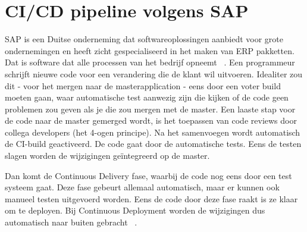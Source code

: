 \section{CI/CD pipeline volgens SAP}
\label{sec:ci-cd-pipeling-volgens-sap}
SAP is een Duitse onderneming dat softwareoplossingen aanbiedt voor grote ondernemingen en heeft zicht gespecialiseerd in het maken van ERP pakketten. Dat is software dat alle processen van het bedrijf opneemt ~\autocite{SAPERP2019}.
Een programmeur schrijft nieuwe code voor een verandering die de klant wil uitvoeren. Idealiter zou dit - voor het mergen naar de masterapplication - eens door een voter build moeten gaan, waar automatische test aanwezig zijn die kijken of de code geen problemen zou geven als je die zou mergen met de master. Een laaste stap voor de code naar de master gemerged wordt, is het toepassen van code reviews door collega developers (het 4-ogen principe).
Na het samenvoegen wordt automatisch de CI-build geactiveerd. De code gaat door de automatische tests. Eens de testen slagen worden de wijzigingen geïntegreerd op de master. 

Dan komt de Continuous Delivery fase, waarbij de code nog eens door een test systeem gaat. Deze fase gebeurt allemaal automatisch, maar er kunnen ook manueel testen uitgevoerd worden. Eens de code door deze fase raakt is ze klaar om te deployen. 
Bij Continuous Deployment worden de wijzigingen dus automatisch naar buiten gebracht ~\autocite{Kramer2018}.